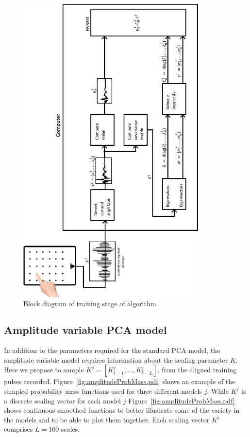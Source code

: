 \begin{figure}[!]
\centering
\includegraphics[width=360px]{trainingsytemRotate.pdf}
\caption{Block diagram of training stage of algorithm.}\label{fig:trainingsytemRotate}
\end{figure}

\subsection{Amplitude variable PCA model}

In addition to the parameters required for the standard PCA model, the amplitude variable model requires information about the scaling parameter $K$. Here we propose to sample $K^j = [K^j_{l=1}, \ldots , K^j_{l=L}]$, from the aligned training pulses recorded. Figure~\ref{fig:amplitudeProbMass.pdf} shows an example of the sampled probability mass functions used for three different models $j$. While $K^j$ is a discrete scaling vector for each model $j$ Figure~\ref{fig:amplitudeProbMass.pdf} shows continuous smoothed functions to better illustrate some of the variety in the models and to be able to plot them together. Each scaling vector $K^j$ comprises $L=100$ scales.

